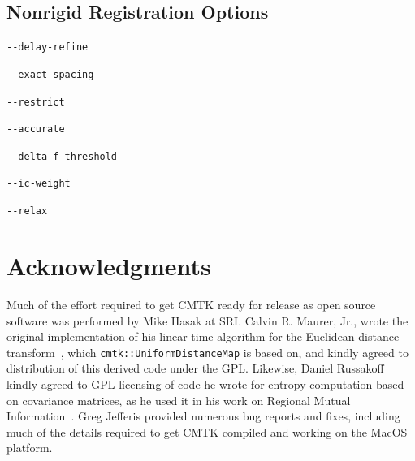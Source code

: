 \documentclass{InsightArticle}
\begin{document}
\subsection{Nonrigid Registration Options}

\verb|--delay-refine|

\verb|--exact-spacing|

\verb|--restrict|

\verb|--accurate|

\verb|--delta-f-threshold|

\verb|--ic-weight| \cite{ChriJohn:2001}

\verb|--relax| \cite{RohlMaurBlue:2003b}

\clearpage
\section*{Acknowledgments}

Much of the effort required to get CMTK ready for release as open source
software was performed by Mike Hasak at SRI. Calvin R. Maurer, Jr., wrote the
original implementation of his linear-time algorithm for the Euclidean
distance transform~\cite{MaurQiRagh:2003}, which
\verb|cmtk::UniformDistanceMap| is based on, and kindly agreed to distribution
of this derived code under the GPL. Likewise, Daniel Russakoff kindly agreed
to GPL licensing of code he wrote for entropy computation based on covariance
matrices, as he used it in his work on Regional Mutual
Information~\cite{RussTomaRohl:2004}. Greg Jefferis provided numerous bug
reports and fixes, including much of the details required to get CMTK compiled
and working on the MacOS platform.

%
%




\printindex
\end{document}
